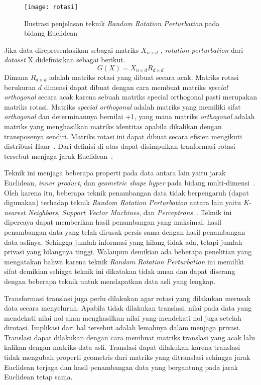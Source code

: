 \begin{figure}
	\centering
	\texttt{[image: rotasi]}
	\caption{Ilustrasi penjelasan teknik \textit{Random Rotation Perturbation} pada bidang Euclidean}
	\label{fig:rotasi}
\end{figure}

Jika data direpresentasikan sebagai matriks \(X_{n \times d}\) , \textit{rotation perturbation} dari \textit{dataset} X didefinisikan sebagai berikut.
\begin{equation}
	G(X) = X_{n \times d} R_{d \times d}
\end{equation}
Dimana \(R_{d \times d}\) adalah matriks rotasi yang dibuat secara acak. Matriks rotasi berukuran \(d\) dimensi dapat dibuat dengan cara membuat matriks \textit{special orthogonal} secara acak karena sebuah matriks {special orthogonal} pasti merupakan matriks rotasi. Matriks \textit{special orthogonal} adalah matriks yang memiliki sifat \textit{orthogonal} dan determinannya bernilai +1, yang mana matriks \textit{orthogonal} adalah matriks yang menghasilkan matriks identitas apabila dikalikan dengan transposenya sendiri. Matriks rotasi ini dapat dibuat secara efisien mengikuti distribusi Haar~\cite{stewart:80:orthogonal}. Dari definisi di atas dapat disimpulkan tranformasi rotasi tersebut menjaga jarak Euclidean~\cite{rotation:05:chenliu}.

Teknik ini menjaga beberapa properti pada data antara lain yaitu jarak Euclidean, \textit{inner product}, dan \textit{geometric shape hyper} pada bidang multi-dimensi~\cite{rezaseifi:11:ppdm}. Oleh karena itu, beberapa teknik penambangan data tidak berpengaruh (dapat digunakan) terhadap teknik \textit{Random Rotation Perturbation} antara lain yaitu \textit{K-nearest Neighbors}, \textit{Support Vector Machines}, dan \textit{Perceptrons}~\cite{rotation:05:chenliu}. Teknik ini dipercaya dapat memberikan hasil penambangan yang maksimal, hasil penambangan data yang telah dirusak persis sama dengan hasil penambangan data aslinya. Sehingga jumlah informasi yang hilang tidak ada, tetapi jumlah privasi yang hilangnya tinggi. Walaupun demikian ada beberapa penelitian yang mengatakan bahwa karena teknik \textit{Random Rotation Perturbation} ini memiliki sifat demikian sehigga teknik ini dikatakan tidak aman dan dapat diserang dengan beberapa teknik untuk mendapatkan data asli yang lengkap.

Transformasi translasi juga perlu dilakukan agar rotasi yang dilakukan merusak data secara menyeluruh. Apabila tidak dilakukan translasi, nilai pada data yang mendekati nilai nol akan menghasilkan nilai yang mendekati nol juga setelah dirotasi. Implikasi dari hal tersebut adalah lemahnya dalam menjaga privasi. Translasi dapat dilakukan dengan cara membuat matriks translasi yang acak lalu kalikan dengan matriks data asli. Translasi dapat dilakukan karena translasi tidak mengubah properti geometris dari matriks yang ditranslasi sehingga jarak Euclidean terjaga dan hasil penambangan data yang bergantung pada jarak Euclidean tetap sama.

